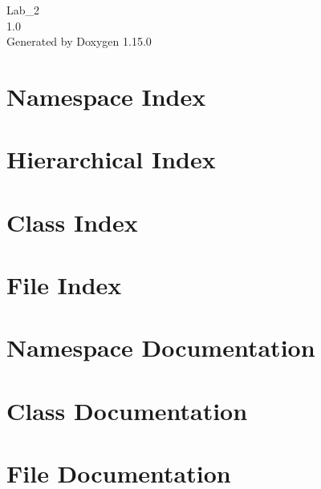 \documentclass[twoside]{book}
\newcommand{\+}{\discretionary{\mbox{\scriptsize$\hookleftarrow$}}{}{}}
\newcommand{\clearemptydoublepage}{%
    \newpage{\pagestyle{empty}\cleardoublepage}%
  }
\begin{document}
  \raggedbottom
    \hypersetup{pageanchor=false,
                bookmarksnumbered=true,
                pdfencoding=unicode
               }
  \begin{titlepage}
  \vspace*{7cm}
  \begin{center}%
  {\Large Lab\+\_\+2}\\
  [1ex]\large 1.\+0 \\
  \vspace*{1cm}
  {\large Generated by Doxygen 1.15.0}\\
  \end{center}
  \end{titlepage}
  \clearemptydoublepage
  \tableofcontents
  \clearemptydoublepage
  \hypersetup{pageanchor=true}

\chapter{Namespace Index}

\chapter{Hierarchical Index}

\chapter{Class Index}

\chapter{File Index}

\chapter{Namespace Documentation}

\chapter{Class Documentation}







\chapter{File Documentation}


  \backmatter
  \newpage
  \clearemptydoublepage
  \printindex
\end{document}
